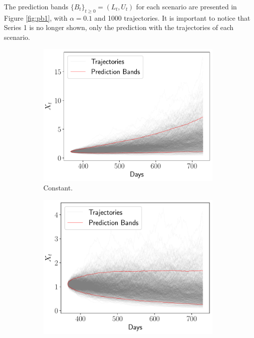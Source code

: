 \documentclass[11pt]{article}
\theoremstyle{definition}
\theoremstyle{remark}
\theoremstyle{remark}
\begin{document}
The prediction bands $\{B_t\}_{t \ge 0 }=\left(L_t, U_t\right)$
for each scenario are presented in Figure \ref{fig:pb1}, with
$\alpha=0.1$ and 1000 trajectories. It is important to notice that
Series 1 is no longer shown, only the prediction with the trajectories
of each scenario.

\begin{figure}
  \centering
  \begin{subfigure}[b]{0.45\textwidth}
      \centering
      \includegraphics[scale=0.45]{bands_constant.pdf}
      \caption{Constant.}
  \end{subfigure}
  \begin{subfigure}[b]{0.45\textwidth}
      \centering
      \includegraphics[scale=0.45]{bands_pessimistic.pdf}

\end{subfigure}
\end{figure}
\end{document}
